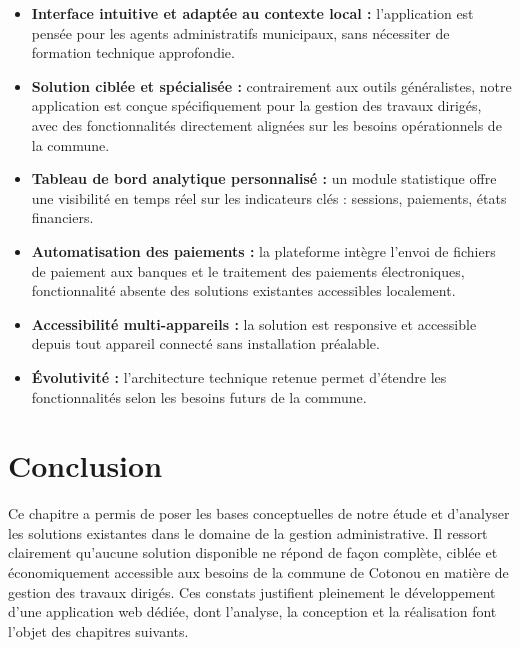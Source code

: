 \begin{itemize}
    \item \textbf{Interface intuitive et adaptée au contexte local :} 
    l'application est pensée pour les agents administratifs municipaux, 
    sans nécessiter de formation technique approfondie.

    \item \textbf{Solution ciblée et spécialisée :} contrairement aux 
    outils généralistes, notre application est conçue spécifiquement pour 
    la gestion des travaux dirigés, avec des fonctionnalités directement 
    alignées sur les besoins opérationnels de la commune.

    \item \textbf{Tableau de bord analytique personnalisé :} un module 
    statistique offre une visibilité en temps réel sur les indicateurs 
    clés : sessions, paiements, états financiers.

    \item \textbf{Automatisation des paiements :} la plateforme intègre 
    l'envoi de fichiers de paiement aux banques et le traitement des 
    paiements électroniques, fonctionnalité absente des solutions 
    existantes accessibles localement.

    \item \textbf{Accessibilité multi-appareils :} la solution est 
    responsive et accessible depuis tout appareil connecté sans 
    installation préalable.

    \item \textbf{Évolutivité :} l'architecture technique retenue permet 
    d'étendre les fonctionnalités selon les besoins futurs de la commune.
\end{itemize}

\section*{Conclusion}

Ce chapitre a permis de poser les bases conceptuelles de notre étude et 
d'analyser les solutions existantes dans le domaine de la gestion 
administrative. Il ressort clairement qu'aucune solution disponible ne 
répond de façon complète, ciblée et économiquement accessible aux besoins 
de la commune de Cotonou en matière de gestion des travaux dirigés. Ces 
constats justifient pleinement le développement d'une application web 
dédiée, dont l'analyse, la conception et la réalisation font l'objet des 
chapitres suivants.
